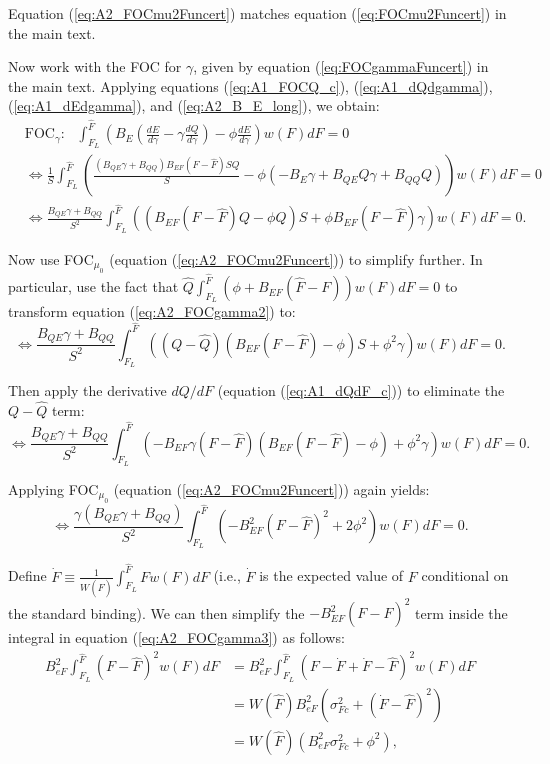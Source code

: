 \documentclass[12pt]{article}
\begin{document}
Equation (\ref{eq:A2_FOCmu2Funcert}) matches equation (\ref{eq:FOCmu2Funcert}) in the main text.

Now work with the FOC for $\gamma$, given by equation (\ref{eq:FOCgammaFuncert}) in the main text. Applying equations (\ref{eq:A1_FOCQ_c}), (\ref{eq:A1_dQdgamma}), (\ref{eq:A1_dEdgamma}), and (\ref{eq:A2_B_E_long}), we obtain:
\begin{align}
&\text{FOC}_{\gamma}: \text{ } \int_{F_L}^{\hat{F}}\left(B_E(\frac{dE}{d\gamma}-\gamma\frac{dQ}{d\gamma}) -\phi\frac{dE}{d\gamma}\right)w(F)dF = 0 \\
&\Leftrightarrow \frac{1}{S}\int_{F_L}^{\hat{F}}\left(\frac{(B_{QE}\gamma+B_{QQ})B_{EF}(F-\hat{F})SQ}{S} -\phi(-B_E\gamma+B_{QE}Q\gamma+B_{QQ}Q)\right)w(F)dF = 0 \nonumber \\
&\Leftrightarrow \frac{B_{QE}\gamma+B_{QQ}}{S^2} \int_{F_L}^{\hat{F}}\left((B_{EF}(F-\hat{F})Q-\phi Q)S + \phi B_{EF}(F-\hat{F})\gamma\right)w(F)dF=0. \label{eq:A2_FOCgamma2}
\end{align}

Now use FOC$_{\mu_0}$ (equation (\ref{eq:A2_FOCmu2Funcert})) to simplify further. In particular, use the fact that $\hat{Q}\int_{F_L}^{\hat{F}}\left(\phi+B_{EF}(\hat{F}-F)\right)w(F)dF=0$ to transform equation (\ref{eq:A2_FOCgamma2}) to:
\begin{equation}
\Leftrightarrow \frac{B_{QE}\gamma+B_{QQ}}{S^2} \int_{F_L}^{\hat{F}}\left((Q-\hat{Q})(B_{EF}(F-\hat{F})-\phi)S + \phi^2\gamma\right)w(F)dF=0.
\end{equation}

Then apply the derivative $dQ/dF$ (equation (\ref{eq:A1_dQdF_c})) to eliminate the $Q-\hat{Q}$ term:
\begin{equation}
\Leftrightarrow \frac{B_{QE}\gamma+B_{QQ}}{S^2} \int_{F_L}^{\hat{F}}\left(-B_{EF}\gamma(F-\hat{F})(B_{EF}(F-\hat{F})-\phi) + \phi^2\gamma\right)w(F)dF=0.
\end{equation}

Applying FOC$_{\mu_0}$ (equation (\ref{eq:A2_FOCmu2Funcert})) again yields:
\begin{equation}
\Leftrightarrow \frac{\gamma(B_{QE}\gamma+B_{QQ})}{S^2} \int_{F_L}^{\hat{F}}\left(-B_{EF}^2(F-\hat{F})^2 + 2\phi^2\right)w(F)dF=0. \label{eq:A2_FOCgamma3}
\end{equation}

Define $\dot{F}\equiv\frac{1}{W(\hat{F})}\int_{F_L}^{\hat{F}}Fw(F)dF$ (i.e., $\dot{F}$ is the expected value of $F$ conditional on the standard binding). We can then simplify the $-B_{EF}^2(F-\hat{F})^2$ term inside the integral in equation (\ref{eq:A2_FOCgamma3}) as follows:
\begin{align}
B_{eF}^2\int_{F_L}^{\hat{F}}(F-\hat{F})^2w(F)dF&=B_{eF}^2\int_{F_L}^{\hat{F}}(F-\dot{F}+\dot{F}-\hat{F})^2w(F)dF \nonumber \\
&=W(\hat{F})B_{eF}^2(\sigma_{Fc}^2+(\dot{F}-\hat{F})^2) \nonumber \\
&=W(\hat{F})(B_{eF}^2\sigma_{Fc}^2+\phi^2), \label{eq:A2_Intval}
\end{align}
\end{document}
